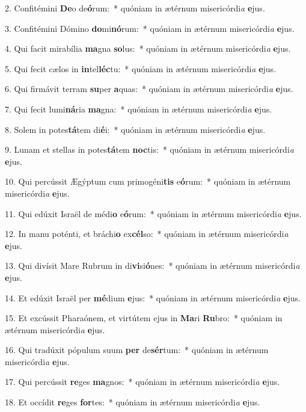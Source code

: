 2. Confitémini \textbf{De}o de\textbf{ó}rum:~*  quóniam in ætérnum misericórdi\textit{a} \textbf{e}jus.\

3. Confitémini Dómino \textbf{do}mi\textbf{nó}rum:~*  quóniam in ætérnum misericórdi\textit{a} \textbf{e}jus.\

4. Qui facit mirabília \textbf{ma}gna \textbf{so}lus:~*  quóniam in ætérnum misericórdi\textit{a} \textbf{e}jus.\

5. Qui fecit cælos in \textbf{in}tel\textbf{léc}tu:~*  quóniam in ætérnum misericórdi\textit{a} \textbf{e}jus.\

6. Qui firmávit terram \textbf{su}per \textbf{a}quas:~*  quóniam in ætérnum misericórdi\textit{a} \textbf{e}jus.\

7. Qui fecit lumi\textbf{ná}ria \textbf{ma}gna:~*  quóniam in ætérnum misericórdi\textit{a} \textbf{e}jus.\

8. Solem in potes\textbf{tá}tem di\textbf{é}i:~*  quóniam in ætérnum misericórdi\textit{a} \textbf{e}jus.\

9. Lunam et stellas in potes\textbf{tá}tem \textbf{noc}tis:~*  quóniam in ætérnum misericórdi\textit{a} \textbf{e}jus.\

10. Qui percússit Ægýptum cum primogéni\textbf{tis} e\textbf{ó}rum:~*  quóniam in ætérnum misericórdi\textit{a} \textbf{e}jus.\

11. Qui edúxit Israël de médi\textbf{o} e\textbf{ó}rum:~*  quóniam in ætérnum misericórdi\textit{a} \textbf{e}jus.\

12. In manu poténti, et bráchi\textbf{o} ex\textbf{cél}so:~*  quóniam in ætérnum misericórdi\textit{a} \textbf{e}jus.\

13. Qui divísit Mare Rubrum in di\textbf{vi}si\textbf{ó}nes:~*  quóniam in ætérnum misericórdi\textit{a} \textbf{e}jus.\

14. Et edúxit Israël per \textbf{mé}dium \textbf{e}jus:~*  quóniam in ætérnum misericórdi\textit{a} \textbf{e}jus.\

15. Et excússit Pharaónem, et virtútem ejus in \textbf{Ma}ri \textbf{Ru}bro:~*  quóniam in ætérnum misericórdi\textit{a} \textbf{e}jus.\

16. Qui tradúxit pópulum suum \textbf{per} de\textbf{sér}tum:~*  quóniam in ætérnum misericórdi\textit{a} \textbf{e}jus.\

17. Qui percússit \textbf{re}ges \textbf{ma}gnos:~*  quóniam in ætérnum misericórdi\textit{a} \textbf{e}jus.\

18. Et occídit \textbf{re}ges \textbf{for}tes:~*  quóniam in ætérnum misericórdi\textit{a} \textbf{e}jus.\

